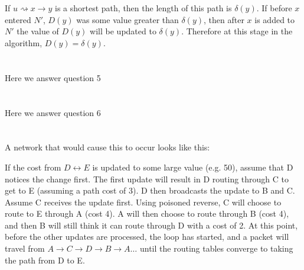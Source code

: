 \documentclass[10pt,a4paper]{article}
\begin{document}
\section{}
If $u\rightsquigarrow x \rightarrow y$ is a shortest path, then the length of this path is $\delta(y)$. If before $x$ entered $N'$, $D(y)$ was some value greater than $\delta(y)$, then after $x$ is added to $N'$ the value of $D(y)$ will be updated to $\delta(y)$. Therefore at this stage in the algorithm, $D(y) = \delta(y)$.
\section{}
Here we answer question 5
\section{}
Here we answer question 6
\section{}
A network that would cause this to occur looks like this:

If the cost from $D \leftrightarrow E$ is updated to some large value (e.g. 50), assume that D notices the change first.
The first update will result in D routing through C to get to E (assuming a path cost of 3). D then broadcasts the update to B and C.
Assume C receives the update first. Using poisoned reverse, C will choose to route to E through A (cost 4). 
A will then choose to route through B (cost 4), and then B will still think it can route through D with a cost of 2.
At this point, before the other updates are processed, the loop has started, and a packet will travel from $A \rightarrow C \rightarrow D \rightarrow B \rightarrow A \ldots$ until the routing tables converge to taking the path from D to E.
\end{document}
